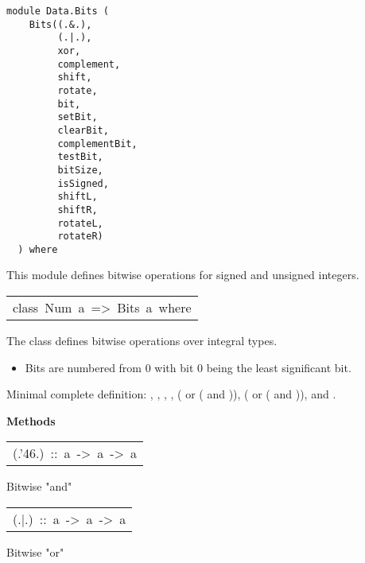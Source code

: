 \label{module:Data.Bits}
\haddockbeginheader
{\haddockverb\begin{verbatim}
module Data.Bits (
    Bits((.&.),
         (.|.),
         xor,
         complement,
         shift,
         rotate,
         bit,
         setBit,
         clearBit,
         complementBit,
         testBit,
         bitSize,
         isSigned,
         shiftL,
         shiftR,
         rotateL,
         rotateR)
  ) where\end{verbatim}}
\haddockendheader

This module defines bitwise operations for signed and unsigned
 integers.
\par

\begin{haddockdesc}
\item[\begin{tabular}{@{}l}
class\ Num\ a\ =>\ Bits\ a\ where
\end{tabular}]\haddockbegindoc
The  class defines bitwise operations over integral types.
\par
\begin{itemize}
\item
 Bits are numbered from 0 with bit 0 being the least
  significant bit.
\par

\end{itemize}
Minimal complete definition: , , , ,
( or ( and )), ( or ( and )),
 and .
\par

\haddockpremethods{}\textbf{Methods}
\begin{haddockdesc}
\item[\begin{tabular}{@{}l}
(.{\char '46}.)\ ::\ a\ ->\ a\ ->\ a
\end{tabular}]\haddockbegindoc
Bitwise "and"
\par

\end{haddockdesc}
\begin{haddockdesc}
\item[\begin{tabular}{@{}l}
(.|.)\ ::\ a\ ->\ a\ ->\ a
\end{tabular}]\haddockbegindoc
Bitwise "or"
\par


\end{haddockdesc}
\end{haddockdesc}
